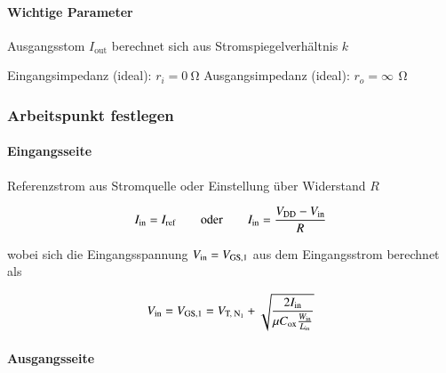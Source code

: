 \paragraph{Wichtige Parameter}  %

\begin{minipage}[t]{0.48\columnwidth}
    \begin{outline}
        \1 Ausgangsstom $I_\text{out}$ berechnet sich aus Stromspiegelverhältnis $k$
    \end{outline}
\end{minipage}
\hfill
\begin{minipage}[t]{0.48\columnwidth}
    \begin{outline}
        \1 Eingangsimpedanz (ideal): $r_i = \qty{0}{\ohm}$
        \1 Ausgangsimpedanz (ideal): $r_o = \infty \, \qty{}{\ohm}$
    \end{outline}
\end{minipage}



\subsubsection{Arbeitspunkt festlegen}

\paragraph{Eingangsseite}

Referenzstrom aus Stromquelle oder Einstellung über Widerstand $R$

\vspace{-0.2cm}

\[
    I_\text{in} = I_\text{ref} \qquad \text{oder} \qquad I_\text{in} = \frac{V_{\rm DD} - V_{\rm in}}{R}
\]

wobei sich die Eingangsspannung $V_{\rm in} = V_{\rm GS,1}$ aus dem Eingangsstrom berechnet als

\vspace{-0.2cm}

\[
    V_\text{in} = V_{\rm GS,1} = V_{\text{T, N}_1} + \sqrt{\frac{2 I_\text{in}}{\mu C_\text{ox}\frac{W_{\rm in}}{L_{\rm in}}}}
\]



\paragraph{Ausgangsseite}

